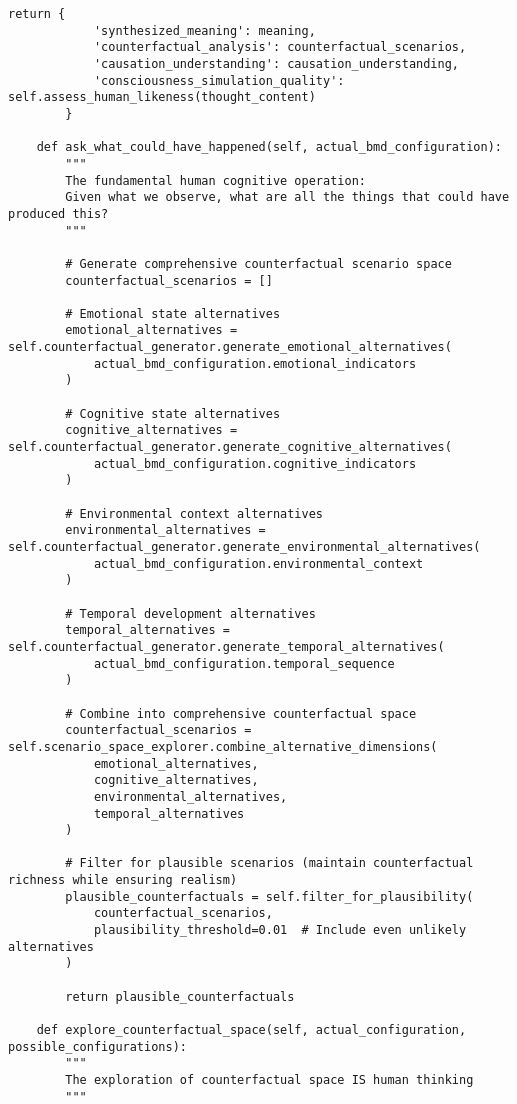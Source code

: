 \documentclass[12pt,a4paper]{article}
\begin{document}
\begin{lstlisting}[style=pythonstyle, caption=Counterfactual BMD Meaning Synthesis Engine]
        return {
            'synthesized_meaning': meaning,
            'counterfactual_analysis': counterfactual_scenarios,
            'causation_understanding': causation_understanding,
            'consciousness_simulation_quality': self.assess_human_likeness(thought_content)
        }
    
    def ask_what_could_have_happened(self, actual_bmd_configuration):
        """
        The fundamental human cognitive operation:
        Given what we observe, what are all the things that could have produced this?
        """
        
        # Generate comprehensive counterfactual scenario space
        counterfactual_scenarios = []
        
        # Emotional state alternatives
        emotional_alternatives = self.counterfactual_generator.generate_emotional_alternatives(
            actual_bmd_configuration.emotional_indicators
        )
        
        # Cognitive state alternatives  
        cognitive_alternatives = self.counterfactual_generator.generate_cognitive_alternatives(
            actual_bmd_configuration.cognitive_indicators
        )
        
        # Environmental context alternatives
        environmental_alternatives = self.counterfactual_generator.generate_environmental_alternatives(
            actual_bmd_configuration.environmental_context
        )
        
        # Temporal development alternatives
        temporal_alternatives = self.counterfactual_generator.generate_temporal_alternatives(
            actual_bmd_configuration.temporal_sequence
        )
        
        # Combine into comprehensive counterfactual space
        counterfactual_scenarios = self.scenario_space_explorer.combine_alternative_dimensions(
            emotional_alternatives,
            cognitive_alternatives, 
            environmental_alternatives,
            temporal_alternatives
        )
        
        # Filter for plausible scenarios (maintain counterfactual richness while ensuring realism)
        plausible_counterfactuals = self.filter_for_plausibility(
            counterfactual_scenarios,
            plausibility_threshold=0.01  # Include even unlikely alternatives
        )
        
        return plausible_counterfactuals
    
    def explore_counterfactual_space(self, actual_configuration, possible_configurations):
        """
        The exploration of counterfactual space IS human thinking
        """
        

\end{lstlisting}
\end{document}
